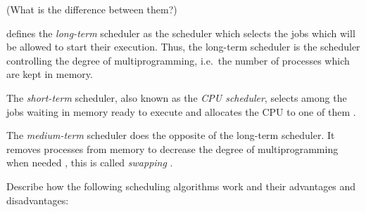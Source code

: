 \documentclass[a4paper,nocourse]{miunasgn}
\begin{document}
\begin{questions}
	(What is the difference between them?)
	\begin{solution}
		\citet[p. 108]{Silberschatz2009osc} defines the \emph{long-term} scheduler 
		as the scheduler which selects the jobs which will be allowed to start 
		their execution.
		Thus, the long-term scheduler is the scheduler controlling the degree of 
		multiprogramming, i.e.\ the number of processes which are kept in memory.

		The \emph{short-term} scheduler, also known as the \emph{CPU scheduler}, 
		selects among the jobs waiting in memory ready to execute and allocates the 
		CPU to one of them \citep[p. 108]{Silberschatz2009osc}.

		The \emph{medium-term} scheduler does the opposite of the long-term 
		scheduler.
		It removes processes from memory to decrease the degree of multiprogramming 
		when needed \citep[p. 109]{Silberschatz2009osc}, this is called 
		\emph{swapping} \citep[p. 109]{Silberschatz2009osc}.
	\end{solution}

	\question\label{q:schedulingalgs}
	Describe how the following scheduling algorithms work and their advantages 
	and disadvantages:
\end{questions}
\end{document}
